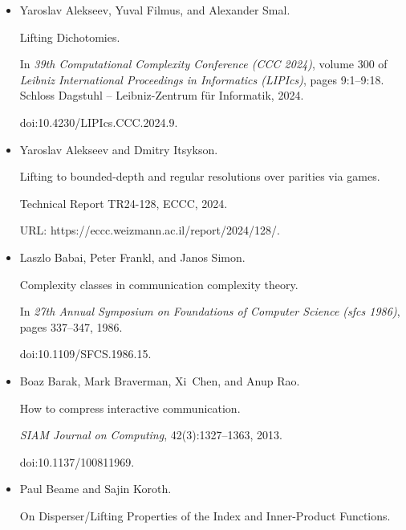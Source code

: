 \documentclass[10pt,a4paper]{article}
\begin{document}
\begin{itemize}


\item[] 
[1]

Yaroslav Alekseev, Yuval Filmus, and Alexander Smal.


Lifting Dichotomies.


In \emph{39th Computational Complexity Conference (CCC 2024)}, volume
300 of \emph{Leibniz International Proceedings in Informatics (LIPIcs)}, pages
9:1–9:18. Schloss Dagstuhl – Leibniz-Zentrum für Informatik, 2024.


doi:10.4230/LIPIcs.CCC.2024.9.





\item[] 
[2]

Yaroslav Alekseev and Dmitry Itsykson.


Lifting to bounded-depth and regular resolutions over parities via
games.


Technical Report TR24-128, ECCC, 2024.


URL: https://eccc.weizmann.ac.il/report/2024/128/.





\item[] 
[3]

Laszlo Babai, Peter Frankl, and Janos Simon.


Complexity classes in communication complexity theory.


In \emph{27th Annual Symposium on Foundations of Computer Science
(sfcs 1986)}, pages 337–347, 1986.


doi:10.1109/SFCS.1986.15.





\item[] 
[4]

Boaz Barak, Mark Braverman, Xi Chen, and Anup Rao.


How to compress interactive communication.


\emph{SIAM Journal on Computing}, 42(3):1327–1363, 2013.


doi:10.1137/100811969.





\item[] 
[5]

Paul Beame and Sajin Koroth.


On Disperser/Lifting Properties of the Index and Inner-Product
Functions.



\end{itemize}
\end{document}
